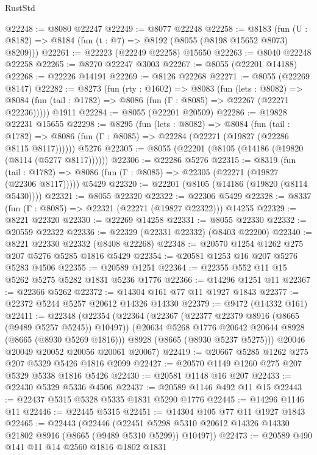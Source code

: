 \begin{lexlean}{RustStd}
\begin{coremodule}
@22248 := @8080 @22247
@22249 := @8077 @22248
@22258 := @8183
    (fun (U : @8182) => @8184 (fun (t : @7) => @8192 (@8055 (@8198 @15652 @8073) @8209)))
@22261 := @22223 (@22249 @22258) @15650
@22263 := @8040 @22248 @22258
@22265 := @8270 @22247 @3003
@22267 := @8055 (@22201 @14188)
@22268 := @22226 @14191
@22269 := @8126 @22268
@22271 := @8055 (@22269 @8147)
@22282 := @8273
    (fun (rty : @1602) =>
    @8083
      (fun (lets : @8082) =>
      @8084 (fun (tail : @1782) => @8086 (fun (Γ : @8085) => @22267 (@22271 @22236)))))
    @1911
@22284 := @8055 (@22201 @20509)
@22286 := @19828 @22231 @15655
@22298 := @8295
    (fun (lets : @8082) =>
    @8084
      (fun (tail : @1782) =>
      @8086 (fun (Γ : @8085) => @22284 (@22271 (@19827 (@22286 @8115 @8117))))))
    @5276
@22305 := @8055 (@22201 (@8105 (@14186 (@19820 (@8114 (@5277 @8117))))))
@22306 := @22286 @5276
@22315 := @8319
    (fun (tail : @1782) => @8086 (fun (Γ : @8085) => @22305 (@22271 (@19827 (@22306 @8117)))))
    @5429
@22320 := @22201 (@8105 (@14186 (@19820 (@8114 @5430))))
@22321 := @8055 @22320
@22322 := @22306 @5429
@22328 := @8337 (fun (Γ : @8085) => @22321 (@22271 (@19827 @22322))) @14255
@22329 := @8221 @22320
@22330 := @22269 @14258
@22331 := @8055 @22330
@22332 := @20559 @22322
@22336 := @22329 (@22331 @22332) (@8403 @22200)
@22340 := @8221 @22330 @22332 (@8408 @22268)
@22348 := @20570 @1254 @1262 @275 @207 @5276 @5285 @1816 @5429
@22354 := @20581 @1253 @16 @207 @5276 @5283 @4506
@22355 := @20589 @1251
@22364 := @22355 @552 @11 @15 @5262 @5275 @5282 @1831 @5236 @1776
@22366 := @14296 @1251 @11
@22367 := @22366 @5262
@22372 := @14304 @161 @77 @11 @1927 @1843
@22377 := @22372 @5244 @5257 @20612 @14326 @14330
@22379 := @9472 (@14332 @161)
@22411 := @22348
    (@22354
      (@22364
        (@22367 (@22377 @22379 @8916 (@8665 (@9489 @5257 @5245)) @10497))
        (@20634 @5268 @1776 @20642 @20644 @8928 (@8665 (@8930 @5269 @1816)))
        @8928
        (@8665 (@8930 @5237 @5275)))
      @20046
      @20049
      @20052
      @20056
      @20061
      @20067)
@22419 := @20667 @5285 @1262 @275 @207 @5329 @5426 @1816 @2099
@22427 := @20570 @1149 @1260 @275 @207 @5329 @5338 @1816 @5426
@22430 := @20581 @1148 @16 @207
@22433 := @22430 @5329 @5336 @4506
@22437 := @20589 @1146 @492 @11 @15
@22443 := @22437 @5315 @5328 @5335 @1831 @5290 @1776
@22445 := @14296 @1146 @11
@22446 := @22445 @5315
@22451 := @14304 @105 @77 @11 @1927 @1843
@22465 := @22443
    (@22446
      (@22451 @5298 @5310 @20612 @14326 @14330 @21802 @8916 (@8665 (@9489 @5310 @5299)) @10497))
@22473 := @20589 @490 @141 @11 @14 @2560 @1816 @1802 @1831

\end{coremodule}
\end{lexlean}
